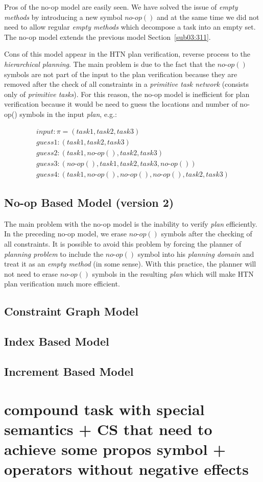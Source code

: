 \medskip\noindent
Pros of the no-op model are easily seen. We have solved the issue of \emph{empty methods} by introducing a new symbol $no\text{-}op()$ and at the same time we did not need to allow regular \emph{empty methods} which decompose a task into an empty set. The no-op model extends the previous model Section~\ref{sub03:311}.

\medskip\noindent
Cons of this model appear in the HTN plan verification, reverse process to the \emph{hierarchical planning}. The main problem is due to the fact that the $no\text{-}op()$ symbols are not part of the input to the plan verification because they are removed after the check of all constraints in a \emph{primitive task network} (consists only of \emph{primitive tasks}). For this reason, the no-op model is inefficient for plan verification because it would be need to guess the locations and number of no-op() symbols in the input \emph{plan}, e.g.:

\begin{gather*}
    input: \pi = (task1, task2, task3) \\
    guess 1: (task1, task2, task3) \\
    guess 2: (task1, no\text{-}op(), task2, task3) \\
    guess 3: (no\text{-}op(), task1, task2, task3, no\text{-}op()) \\
    guess 4: (task1, no\text{-}op(), no\text{-}op(), no\text{-}op(), task2, task3)
\end{gather*}

\subsection{No-op Based Model (version 2)}

\medskip\noindent
The main problem with the no-op model is the inability to verify \emph{plan} efficiently. In the preceding no-op model, we erase $no\text{-}op()$ symbols after the checking of all constraints. It is possible to avoid this problem by forcing the planner of \emph{planning problem} to include the $no\text{-}op()$ symbol into his \emph{planning domain} and treat it as an \emph{empty method} (in some sense). With this practice, the planner will not need to erase $no\text{-}op()$ symbols in the resulting \emph{plan} which will make HTN plan verification much more efficient.

\subsection{Constraint Graph Model}

\subsection{Index Based Model}

\subsection{Increment Based Model}

\section{compound task with special semantics + CS that need to achieve some propos symbol + operators without negative effects}

